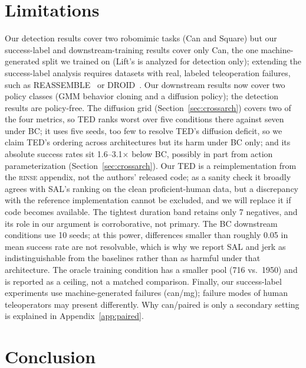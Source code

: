 \documentclass[10pt]{article}
\newcommand{\rinse}{\textsc{rinse}}
\begin{document}
\section{Limitations}
\label{sec:limitations}

Our detection results cover two robomimic tasks (Can and Square) but our
success-label and downstream-training results cover only Can, the one machine-generated split we trained on (Lift's is analyzed for detection only); extending the
success-label analysis requires datasets with real, labeled teleoperation
failures, such as \mbox{REASSEMBLE}~\citep{reassemble} or DROID~\citep{droid}.
Our downstream results now cover two policy classes (GMM behavior
cloning and a diffusion policy); the detection results are policy-free. The
diffusion grid (Section~\ref{sec:crossarch}) covers two of the four metrics,
so TED ranks worst over five conditions there against seven under BC; it
uses five seeds, too few to resolve TED's diffusion deficit, so we claim
TED's ordering across architectures but its harm under BC only; and its
absolute success rates sit 1.6--3.1$\times$ below BC, possibly in part from
action parameterization (Section~\ref{sec:crossarch}).
Our TED is a reimplementation from the \rinse{} appendix, not the authors'
released code; as a sanity check it broadly agrees with SAL's ranking on the
clean proficient-human data, but a discrepancy with the reference
implementation cannot be excluded, and we will replace it if code becomes
available. The tightest duration band retains only 7 negatives, and its
role in our argument is corroborative, not primary. The BC downstream
conditions use 10 seeds; at this power, differences smaller than roughly
0.05 in mean success rate are not resolvable, which is why we report SAL and
jerk as indistinguishable from the baselines rather than as harmful under
that architecture. The oracle training
condition has a smaller pool (716 vs.\ 1950) and is reported as a ceiling,
not a matched comparison. Finally, our success-label experiments use
machine-generated failures (can/mg); failure modes of human teleoperators
may present differently. Why can/paired is only a secondary setting is
explained in Appendix~\ref{app:paired}.

\section{Conclusion}
\end{document}
